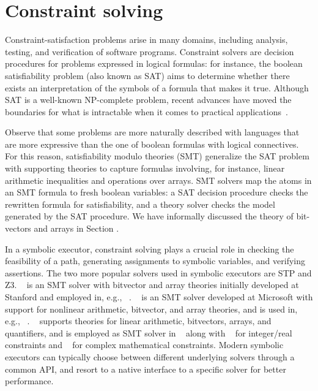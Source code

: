 
\section{Constraint solving}

Constraint-satisfaction problems arise in many domains, including analysis, testing, and verification of software programs. Constraint solvers are decision procedures for problems expressed in logical formulas: for instance, the boolean satisfiability problem (also known as SAT) aims to determine whether there exists an interpretation of the symbols of a formula that makes it true. Although SAT is a well-known NP-complete problem, recent advances have moved the boundaries for what is intractable when it comes to practical applications~\cite{SMT-CACM11}. 

Observe that some problems are more naturally described with languages that are more expressive than the one of boolean formulas with logical connectives. For this reason, satisfiability modulo theories (SMT) generalize the SAT problem with supporting theories to capture formulas involving, for instance, linear arithmetic inequalities and operations over arrays. SMT solvers map the atoms in an SMT formula to fresh boolean variables: a SAT decision procedure checks the rewritten formula for satisfiability, and a theory solver checks the model generated by the SAT procedure. We have informally discussed the theory of bit-vectors and arrays in Section \missing.

In a symbolic executor, constraint solving plays a crucial role in checking the feasibility of a path, generating assignments to symbolic variables, and verifying assertions. The two more popular solvers used in symbolic executors are STP and Z3. ~\cite{STP-CAV07,STP-TR07} is an SMT solver with bitvector and array theories initially developed at Stanford and employed in, e.g., ~\cite{EXE-CCS06,KLEE-OSDI08,MineSweeper-BOTNET08,AEG-NDSS11}. ~\cite{Z3-TACS08} is an SMT solver developed at Microsoft with support for nonlinear arithmetic, bitvector, and array theories, and is used in, e.g., ~\cite{MAYHEM-SP12,SAGE-QUEUE12,FIRMALICE-NDSS15}. ~\cite{CVC3-CAV07} supports theories for linear arithmetic, bitvectors, arrays, and quantifiers, and is employed as SMT solver in ~\cite{PATHFINDER-ASE10} along with ~\cite{CHOCO} for integer/real constraints and ~\cite{CORAL-NFM11} for complex mathematical constraints. Modern symbolic executors can typically choose between different underlying solvers through a common API, and resort to a native interface to a specific solver for better performance.

